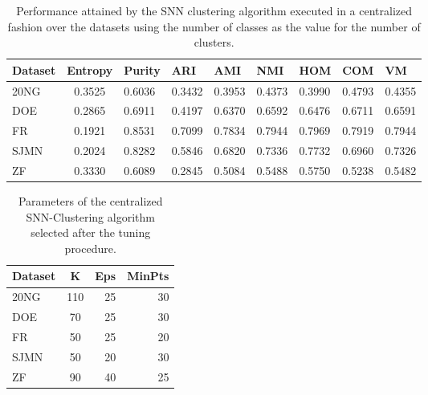 \documentclass[a4paper]{article}
\begin{document}
\begin{table}[h]
\centering
\begin{tabular}{l|clllllll}
\textbf{Dataset} & \textbf{Entropy} & \textbf{Purity} & \textbf{ARI} & \textbf{AMI}  & \textbf{NMI} & \textbf{HOM} & \textbf{COM} & \textbf{VM} \\ \hline
20NG    & 0.3525 & 0.6036 & 0.3432 & 0.3953 & 0.4373 & 0.3990 & 0.4793 & 0.4355\\
DOE     & 0.2865 & 0.6911 & 0.4197 & 0.6370 & 0.6592 & 0.6476 & 0.6711 & 0.6591\\
FR      & 0.1921 & 0.8531 & 0.7099 & 0.7834 & 0.7944 & 0.7969 & 0.7919 & 0.7944\\
SJMN    & 0.2024 & 0.8282 & 0.5846 & 0.6820 & 0.7336 & 0.7732 & 0.6960 & 0.7326\\
ZF      & 0.3330 & 0.6089 & 0.2845 & 0.5084 & 0.5488 & 0.5750 & 0.5238 & 0.5482\\ \hline
\end{tabular}
\caption{Performance attained by the SNN clustering algorithm executed in a centralized fashion over the datasets using the number of classes as the value for the number of clusters.}
\label{table:centralizedsnn_results}
\end{table}

\begin{table}[h]
\centering
\begin{tabular}{l|crr}
\textbf{Dataset} & \textbf{K} & \textbf{Eps} & \textbf{MinPts} \\ \hline
20NG    & 110& 25 & 30 \\
DOE     &  70& 25 & 30 \\
FR      &  50& 25 & 20  \\
SJMN    &  50& 20 & 30 \\
ZF      &  90& 40 & 25 \\ \hline
\end{tabular}
\caption{Parameters of the centralized SNN-Clustering algorithm selected after the tuning procedure.}
\label{table:centralizedsnn_params}
\end{table}
\end{document}
